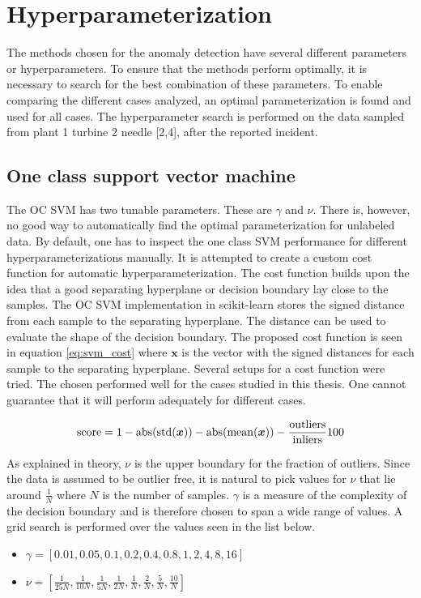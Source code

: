    \section{Hyperparameterization}
        The methods chosen for the anomaly detection have several different parameters or hyperparameters. To ensure that the methods perform optimally, it is necessary to search for the best combination of these parameters. To enable comparing the different cases analyzed, an optimal parameterization is found and used for all cases. The hyperparameter search is performed on the data sampled from plant 1 turbine 2 needle [2,4], after the reported incident. 
            \subsection{One class support vector machine}
                The OC SVM has two tunable parameters. These are $\gamma$ and $\nu$. There is, however, no good way to automatically find the optimal parameterization for unlabeled data. By default, one has to inspect the one class SVM performance for different hyperparameterizations manually. It is attempted to create a custom cost function for automatic hyperparameterization. The cost function builds upon the idea that a good separating hyperplane or decision boundary lay close to the samples. The OC SVM implementation in scikit-learn stores the signed distance from each sample to the separating hyperplane. The distance can be used to evaluate the shape of the decision boundary. The proposed cost function is seen in equation \ref{eq:svm_cost} where $\bm{x}$ is the vector with the signed distances for each sample to the separating hyperplane. Several setups for a cost function were tried. The chosen performed well for the cases studied in this thesis. One cannot guarantee that it will perform adequately for different cases.  
                
                \begin{align}
                    \operatorname{score} = 1 - \operatorname{abs}(\operatorname{std}(\bm{x})) - \operatorname{abs}(\operatorname{mean}(\bm{x})) -\frac{\operatorname{outliers}}{\operatorname{inliers}}100
                    \label{eq:svm_cost}
                \end{align}
            
                As explained in theory, $\nu$ is the upper boundary for the fraction of outliers. Since the data is assumed to be outlier free, it is natural to pick values for $\nu$ that lie around $\frac{1}{N}$ where $N$ is the number of samples. $\gamma$ is a measure of the complexity of the decision boundary and is therefore chosen to span a wide range of values. A grid search is performed over the values seen in the list below. 
                \begin{itemize}
                    \item $\gamma =  [0.01,0.05,0.1,0.2,0.4,0.8,1,2,4,8,16]$
                    \item $\nu = [\frac{1}{25N}, \frac{1}{10N},\frac{1}{5N},\frac{1}{2N},\frac{1}{N},\frac{2}{N},\frac{5}{N},\frac{10}{N}]$
                    \label{list:svm_grid}
                \end{itemize}
                
